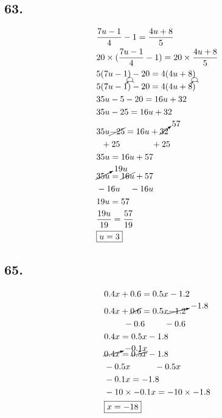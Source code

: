 \documentclass{article}
\newcommand{\tikzmark}[1]{\tikz[overlay,remember picture] \node (#1) {};}
\newcommand{\DrawBox}[2]{%
    \begin{tikzpicture}[overlay,remember picture]
        \draw[->,shorten >=5pt,shorten <=5pt,out=70,in=130,distance=0.5cm,#1] (MarkA.north) to (MarkC.north);
        \draw[->,shorten >=5pt,shorten <=5pt,out=50,in=140,distance=0.3cm,#2] (MarkA.north) to (MarkB.north);
    \end{tikzpicture}
}
\begin{document}
    \subsection*{63.}
    \begin{align*}
        & \frac{7u - 1}{4} - 1 = \frac{4u + 8}{5}\\
        & 20 \times (\frac{7u - 1}{4} - 1) = 20 \times  \frac{4u + 8}{5}\\
        & 5(7u - 1) - 20 = 4(4u + 8) \\
        & \tikzmark{MarkA}5(7u\tikzmark{MarkB} - 1\tikzmark{MarkC})\DrawBox{black}{black} - 20 = \tikzmark{MarkA}4(4u\tikzmark{MarkB} + 8\tikzmark{MarkC})\DrawBox{black}{black}  \\
        & 35u - 5 - 20 = 16u + 32 \\
        & 35u - 25 = 16u + 32 \\
        & 35u \cancel{-25} = 16u + \cancelto{57}{32} \\
        & \hspace{.2cm} +25 \hspace{1.3cm} + 25 \\
        & 35u = 16u + 57 \\
        & \cancelto{19u}{35u} = \cancel{16u} + 57 \\
        & - 16u \hspace{.4cm} -16u \\
        & 19u = 57 \\
        & \frac{19u}{19} = \frac{57}{19} \\
        & \boxed{u = 3}
    \end{align*}

    \subsection*{65.}
    \begin{align*}
        & 0.4x + 0.6 = 0.5x -1.2\\
        & 0.4x + \cancel{0.6} = 0.5x \cancelto{-1.8}{-1.2}\\
        & \hspace{.8cm} - 0.6 \hspace{.8cm} - 0.6\\
        & 0.4x = 0.5x -1.8\\
        & \cancelto{-0.1x}{0.4x} = \cancel{0.5x} - 1.8 \\
        & -0.5x \hspace{1cm} - 0.5x \\
        & -0.1x = -1.8 \\
        & -10 \times -0.1x = -10 \times -1.8 \\
        & \boxed{x = -18} \\
    \end{align*}
\end{document}
